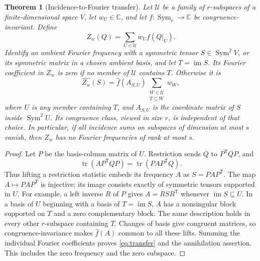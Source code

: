 \documentclass[11pt,a4paper]{article}
\newtheorem{theorem}{Theorem}[section]
\theoremstyle{definition}
\theoremstyle{remark}
\newcommand{\C}{\mathbb C}
\newcommand{\Sym}{\operatorname{Sym}}
\newcommand{\tr}{\operatorname{tr}}
\newcommand{\im}{\operatorname{im}}
\begin{document}
\begin{theorem}[Incidence-to-Fourier transfer]\label{thm:transfer}
Let $\mathcal U$ be a family of $r$-subspaces of a finite-dimensional
space $V$, let $w_U\in\C$, and let $f:\Sym_r\to\C$ be
congruence-invariant. Define
\[
 Z_w(Q)=\sum_{U\in\mathcal U}w_U f(Q|_U).
\]
Identify an ambient Fourier frequency with a symmetric tensor
$S\in\Sym^2V$, or its symmetric matrix in a chosen ambient basis, and
let $T=\im S$. Its Fourier coefficient in $Z_w$ is zero if no member
of $\mathcal U$ contains $T$. Otherwise it is
\begin{equation}\label{eq:transfer}
 \widehat {Z_w}(S)=\widehat f(A_{S,U})
               \sum_{\substack{W\in\mathcal U\\T\subseteq W}}w_W,
\end{equation}
where $U$ is any member containing $T$, and $A_{S,U}$ is the coordinate
matrix of $S$ inside $\Sym^2U$. Its congruence class, viewed in size $r$,
is independent of that choice.
In particular, if all incidence sums on subspaces of dimension at most
$s$ vanish, then $Z_w$ has no Fourier frequencies of rank at most $s$.
\end{theorem}
\begin{proof}
Let $P$ be the basis-column matrix of $U$. Restriction sends $Q$ to
$P^{\mathsf T}QP$, and
\[
 \tr(A P^{\mathsf T}QP)=\tr(PAP^{\mathsf T}Q).
\]
Thus lifting a restriction statistic embeds its frequency $A$ as
$S=PAP^{\mathsf T}$. The map $A\mapsto PAP^{\mathsf T}$ is injective;
its image consists exactly of symmetric tensors supported in $U$.
For example, a left inverse $R$ of $P$ gives
$A=RSR^{\mathsf T}$ whenever $\im S\subseteq U$.
In a basis of $U$ beginning with a basis of $T=\im S$, $A$ has a
nonsingular block supported on $T$ and a zero complementary block.
The same description holds in every other $r$-subspace containing $T$.
Changes of basis give congruent matrices, so congruence-invariance
makes $\widehat f(A)$ common to all these lifts. Summing the individual
Fourier coefficients proves \eqref{eq:transfer} and the annihilation
assertion. This includes the zero frequency and the zero subspace.
\end{proof}
\end{document}

